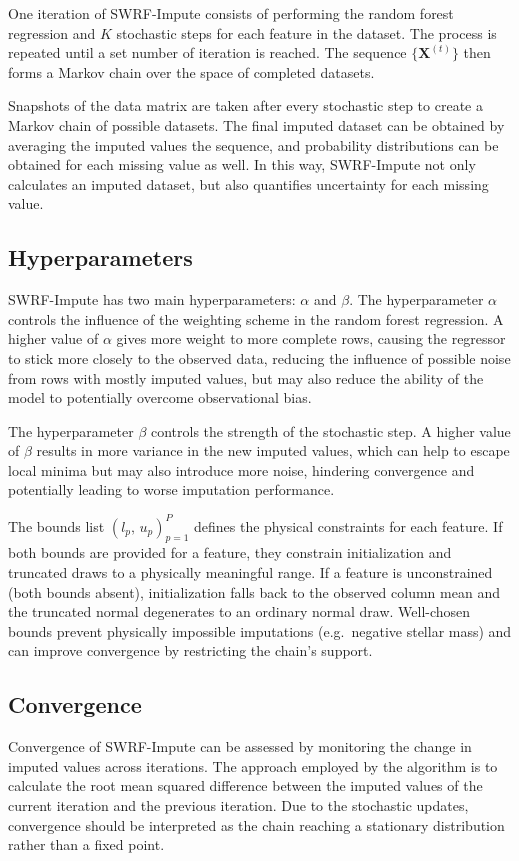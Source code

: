 \documentclass[preprint]{aastex631}
\begin{document}
One iteration of SWRF-Impute consists of performing the random forest regression and $K$ stochastic steps for each feature in the dataset. The process is repeated until a set number of iteration is reached. The sequence $\{\mathbf{X}^{(t)}\}$ then forms a Markov chain over the space of completed datasets.

Snapshots of the data matrix are taken after every stochastic step to create a Markov chain of possible datasets. The final imputed dataset can be obtained by averaging the imputed values the sequence, and probability distributions can be obtained for each missing value as well. In this way, SWRF-Impute not only calculates an imputed dataset, but also quantifies uncertainty for each missing value.

\subsection{Hyperparameters}
SWRF-Impute has two main hyperparameters: $\alpha$ and $\beta$. The hyperparameter $\alpha$ controls the influence of the weighting scheme in the random forest regression. A higher value of $\alpha$ gives more weight to more complete rows, causing the regressor to stick more closely to the observed data, reducing the influence of possible noise from rows with mostly imputed values, but may also reduce the ability of the model to potentially overcome observational bias.

The hyperparameter $\beta$ controls the strength of the stochastic step. A higher value of $\beta$ results in more variance in the new imputed values, which can help to escape local minima but may also introduce more noise, hindering convergence and potentially leading to worse imputation performance.

The bounds list $(l_p,\, u_p)_{p=1}^{P}$ defines the physical constraints for each feature. If both bounds are provided for a feature, they constrain initialization and truncated draws to a physically meaningful range. If a feature is unconstrained (both bounds absent), initialization falls back to the observed column mean and the truncated normal degenerates to an ordinary normal draw. Well-chosen bounds prevent physically impossible imputations (e.g.\ negative stellar mass) and can improve convergence by restricting the chain's support.

\subsection{Convergence}
Convergence of SWRF-Impute can be assessed by monitoring the change in imputed values across iterations. The approach employed by the algorithm is to calculate the root mean squared difference between the imputed values of the current iteration and the previous iteration. Due to the stochastic updates, convergence should be interpreted as the chain reaching a stationary distribution rather than a fixed point.
\end{document}
